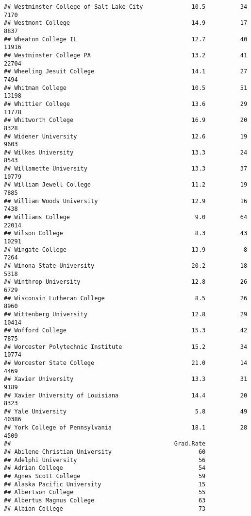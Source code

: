 \documentclass[
]{article}
\begin{document}
\begin{verbatim}
## Westminster College of Salt Lake City              10.5          34   7170
## Westmont College                                   14.9          17   8837
## Wheaton College IL                                 12.7          40  11916
## Westminster College PA                             13.2          41  22704
## Wheeling Jesuit College                            14.1          27   7494
## Whitman College                                    10.5          51  13198
## Whittier College                                   13.6          29  11778
## Whitworth College                                  16.9          20   8328
## Widener University                                 12.6          19   9603
## Wilkes University                                  13.3          24   8543
## Willamette University                              13.3          37  10779
## William Jewell College                             11.2          19   7885
## William Woods University                           12.9          16   7438
## Williams College                                    9.0          64  22014
## Wilson College                                      8.3          43  10291
## Wingate College                                    13.9           8   7264
## Winona State University                            20.2          18   5318
## Winthrop University                                12.8          26   6729
## Wisconsin Lutheran College                          8.5          26   8960
## Wittenberg University                              12.8          29  10414
## Wofford College                                    15.3          42   7875
## Worcester Polytechnic Institute                    15.2          34  10774
## Worcester State College                            21.0          14   4469
## Xavier University                                  13.3          31   9189
## Xavier University of Louisiana                     14.4          20   8323
## Yale University                                     5.8          49  40386
## York College of Pennsylvania                       18.1          28   4509
##                                               Grad.Rate
## Abilene Christian University                         60
## Adelphi University                                   56
## Adrian College                                       54
## Agnes Scott College                                  59
## Alaska Pacific University                            15
## Albertson College                                    55
## Albertus Magnus College                              63
## Albion College                                       73

\end{verbatim}
\end{document}
